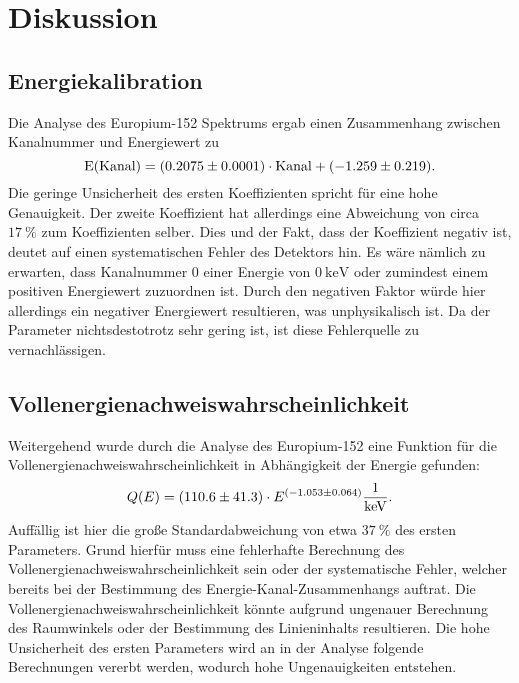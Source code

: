 \chapter{Diskussion}
\label{cha:Diskussion}

\section{Energiekalibration}

Die Analyse des Europium-152 Spektrums ergab einen Zusammenhang zwischen Kanalnummer und Energiewert zu
\begin{equation}
    \mathrm{E(Kanal)} = \qty{0.2075 \pm 0.0001}{} \cdot \mathrm{Kanal} + \qty{-1.259 \pm 0.219}{}.
\end{equation}
Die geringe Unsicherheit des ersten Koeffizienten spricht für eine hohe Genauigkeit. Der zweite Koeffizient hat allerdings
eine Abweichung von circa $\qty{17}{\%}$ zum Koeffizienten selber. Dies und der Fakt, dass der Koeffizient negativ ist, deutet
auf einen systematischen Fehler des Detektors hin. Es wäre nämlich zu erwarten, dass Kanalnummer $0$ einer Energie von $\qty{0}{\kilo\electronvolt}$
oder zumindest einem positiven Energiewert zuzuordnen ist. Durch den negativen Faktor würde hier allerdings ein negativer Energiewert
resultieren, was unphysikalisch ist. Da der Parameter nichtsdestotrotz sehr gering ist, ist diese Fehlerquelle zu vernachlässigen.

\section{Vollenergienachweiswahrscheinlichkeit}

Weitergehend wurde durch die Analyse des Europium-152 eine Funktion für die Vollenergienachweiswahrscheinlichkeit in Abhängigkeit der Energie gefunden:
\begin{equation}
    Q(E) = \qty{110.6 \pm 41.3}{}\cdot E^{\qty{-1.053 \pm 0.064}{}} \qty{}{\per\kilo\electronvolt}.
\end{equation}
Auffällig ist hier die große Standardabweichung von etwa $\qty{37}{\%}$ des ersten Parameters. Grund hierfür muss eine fehlerhafte Berechnung des 
Vollenergienachweiswahrscheinlichkeit sein oder der systematische Fehler, welcher bereits bei der Bestimmung des Energie-Kanal-Zusammenhangs auftrat.
Die Vollenergienachweiswahrscheinlichkeit könnte aufgrund ungenauer Berechnung des Raumwinkels oder der Bestimmung des Linieninhalts resultieren.
Die hohe Unsicherheit des ersten Parameters wird an in der Analyse folgende Berechnungen vererbt werden, wodurch hohe Ungenauigkeiten entstehen.

